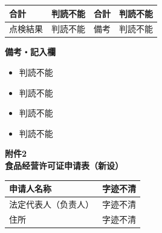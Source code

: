\documentclass[UTF8,10pt,a4paper,fontset=fandol]{ctexart}
\newcommand{\fieldvalue}[1]{#1}
\newcommand{\handwritten}[1]{#1}
\begin{document}
\vspace{1em}

\noindent
\begin{tabularx}{\textwidth}{|l|X|l|X|}
\hline
合計 &
\fieldvalue{\handwritten{判読不能}} &
合計 &
\fieldvalue{\handwritten{判読不能}} \\
\hline
点検結果 &
\fieldvalue{\handwritten{判読不能}} &
備考 &
\fieldvalue{\handwritten{判読不能}} \\
\hline
\end{tabularx}

\vspace{1em}

\noindent\textbf{備考・記入欄}

\begin{itemize}
\item
\fieldvalue{\handwritten{判読不能}}
\item
\fieldvalue{\handwritten{判読不能}}
\item
\fieldvalue{\handwritten{判読不能}}
\item
\fieldvalue{\handwritten{判読不能}}
\end{itemize}


\newpage

\begin{center}
\textbf{附件2}\\[1ex]
\textbf{食品经营许可证申请表（新设）}
\end{center}

\noindent
\begin{tabularx}{\textwidth}{|l|X|}
\hline
申请人名称 &
\fieldvalue{\handwritten{字迹不清}}\\
\hline
法定代表人（负责人） &
\fieldvalue{\handwritten{字迹不清}}\\
\hline
住所 &
\fieldvalue{\handwritten{字迹不清}}\\
\hline
\end{tabularx}
\end{document}

